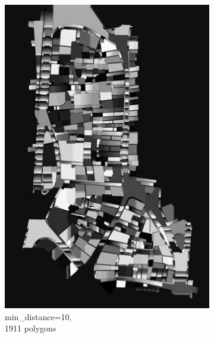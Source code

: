 \documentclass[12pt]{article}
\begin{document}
\begin{figure}[H]
	\begin{subfigure}[b]{.3\textwidth}
		\centering
		\includegraphics[width=1\linewidth]{images/polygon_recovery/watershed1_distance10_b1911.png}  
		\caption{min\_distance=10, \\ 1911 polygons}
	\end{subfigure}
	\begin{subfigure}[b]{.3\textwidth}
		\centering

\end{subfigure}
\end{figure}
\end{document}
